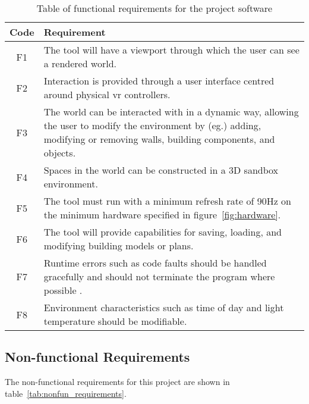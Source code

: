         \begin{center}
            \begin{longtable}{ | c | p{} |  }
                \caption{Table of functional requirements for the project software}\label{tab:fun_requirements}\\%
                \hline Code & Requirement \\ \hline
                    F1 & The tool will have a viewport through which the user can see a rendered world. \\  \hline
                    F2 & Interaction is provided through a user interface centred around physical \acrshort{vr} controllers. \\\hline
                    F3 & The world can be interacted with in a dynamic way, allowing the user to modify the environment by (eg.) adding, modifying or removing walls, building components, and objects. \\\hline
                    F4 & Spaces in the world can be constructed in a 3D sandbox environment. \\\hline
                    F5 & The tool must run with a minimum refresh rate of 90Hz on the minimum hardware specified in figure~\ref{fig:hardware}. \\\hline
                    F6 & The tool will provide capabilities for saving, loading, and modifying building models or plans. \\\hline
                    F7 & Runtime errors such as code faults should be handled gracefully and should not terminate the program where possible . \\\hline
                    F8 & Environment characteristics such as time of day and light temperature should be modifiable. \\\hline
            \end{longtable}
        \end{center}
    
    \subsection{Non-functional Requirements}
    
        The non-functional requirements for this project are shown in table~\ref{tab:nonfun_requirements}.
        
